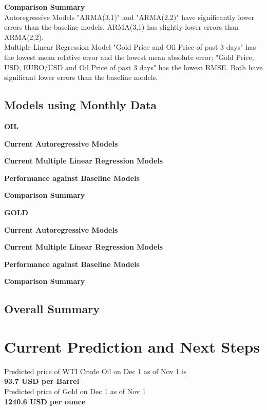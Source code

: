 \documentclass[runningheads]{llncs}
\begin{document}
\noindent\textbf{Comparison Summary} \\
Autoregressive Models "ARMA(3,1)" and "ARMA(2,2)" have significantly lower errors than the baseline models. ARMA(3,1) has slightly lower errors 
than ARMA(2,2). \\
Multiple Linear Regression Model "Gold Price and Oil Price of past 3 days" has the lowest mean relative error and the lowest mean absolute error; 
 "Gold Price, USD, EURO/USD and Oil Price of past 3 days" has the lowest RMSE.
Both have significant lower errors than the baseline models. \\

\subsection{Models using Monthly Data}

\noindent\textbf{OIL}

\noindent\textbf{Current Autoregressive Models}

\noindent\textbf{Current Multiple Linear Regression Models}

\noindent\textbf{Performance against Baseline Models}

\noindent\textbf{Comparison Summary}


\noindent\textbf{GOLD}

\noindent\textbf{Current Autoregressive Models}

\noindent\textbf{Current Multiple Linear Regression Models}

\noindent\textbf{Performance against Baseline Models}

\noindent\textbf{Comparison Summary}


\subsection{Overall Summary}


\section{Current Prediction and Next Steps}

Predicted price of WTI Crude Oil on Dec 1 as of Nov 1 is \\
\textbf{93.7 USD per Barrel} \\

\noindent Predicted price of Gold on Dec 1 as of Nov 1 \\
\textbf{1240.6 USD per ounce} \\
\end{document}
